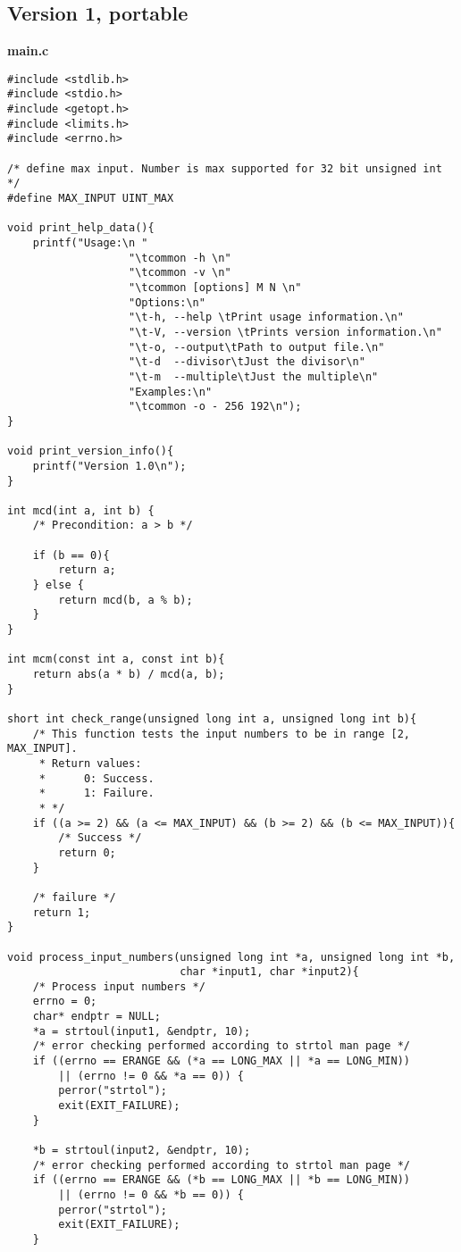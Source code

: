 \documentclass[a4paper,10pt]{article}
\begin{document}
\subsection{Version 1, portable}
\textbf{main.c}
\begin{lstlisting}[style=customc]
#include <stdlib.h>
#include <stdio.h>
#include <getopt.h>
#include <limits.h>
#include <errno.h>

/* define max input. Number is max supported for 32 bit unsigned int */
#define MAX_INPUT UINT_MAX

void print_help_data(){
    printf("Usage:\n "
                   "\tcommon -h \n"
                   "\tcommon -v \n"
                   "\tcommon [options] M N \n"
                   "Options:\n"
                   "\t-h, --help \tPrint usage information.\n"
                   "\t-V, --version \tPrints version information.\n"
                   "\t-o, --output\tPath to output file.\n"
                   "\t-d  --divisor\tJust the divisor\n"
                   "\t-m  --multiple\tJust the multiple\n"
                   "Examples:\n"
                   "\tcommon -o - 256 192\n");
}

void print_version_info(){
    printf("Version 1.0\n");
}

int mcd(int a, int b) {
    /* Precondition: a > b */

    if (b == 0){
        return a;
    } else {
        return mcd(b, a % b);
    }
}

int mcm(const int a, const int b){
    return abs(a * b) / mcd(a, b);
}

short int check_range(unsigned long int a, unsigned long int b){
    /* This function tests the input numbers to be in range [2, MAX_INPUT].
     * Return values:
     *      0: Success.
     *      1: Failure.
     * */
    if ((a >= 2) && (a <= MAX_INPUT) && (b >= 2) && (b <= MAX_INPUT)){
        /* Success */
        return 0;
    }

    /* failure */
    return 1;
}

void process_input_numbers(unsigned long int *a, unsigned long int *b,
                           char *input1, char *input2){
    /* Process input numbers */
    errno = 0;
    char* endptr = NULL;
    *a = strtoul(input1, &endptr, 10);
    /* error checking performed according to strtol man page */
    if ((errno == ERANGE && (*a == LONG_MAX || *a == LONG_MIN))
        || (errno != 0 && *a == 0)) {
        perror("strtol");
        exit(EXIT_FAILURE);
    }

    *b = strtoul(input2, &endptr, 10);
    /* error checking performed according to strtol man page */
    if ((errno == ERANGE && (*b == LONG_MAX || *b == LONG_MIN))
        || (errno != 0 && *b == 0)) {
        perror("strtol");
        exit(EXIT_FAILURE);
    }


\end{lstlisting}
\end{document}
